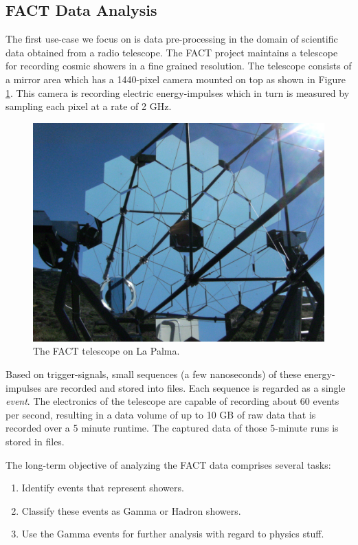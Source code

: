 \subsection{\label{sec:fact}FACT Data Analysis}
The first use-case we focus on is data pre-processing in the domain of
scientific data obtained from a radio telescope. The FACT project
maintains a telescope for recording cosmic showers in a fine grained
resolution. The telescope consists of a mirror area which has a
1440-pixel camera mounted on top as shown in Figure
\ref{fig:factTelescope}. This camera is recording electric
energy-impulses which in turn is measured by sampling each pixel at a
rate of 2 GHz.

\begin{figure}[h!]
\centering
\includegraphics[scale=0.2]{graphics/fact-telescope.jpg}
\caption{\label{fig:factTelescope}The FACT telescope on La Palma.}
\end{figure}

Based on trigger-signals, small sequences (a few
nanoseconds) of these energy-impulses are recorded and stored into 
files. Each sequence is regarded as a single {\em event}. 
The electronics of the telescope are capable of recording about
60 events per second, resulting in a data volume of up to 10 GB
of raw data that is recorded over a 5 minute runtime. The captured
data of those 5-minute runs is stored in files.


The long-term objective of analyzing the FACT data comprises several tasks:
\begin{enumerate}
  \item Identify events that represent showers.
  \item Classify these events as Gamma or Hadron showers.
  \item Use the Gamma events for further analysis with regard to physics stuff.
\end{enumerate}

